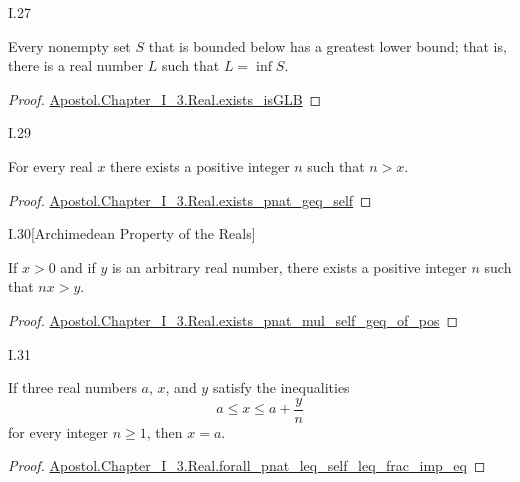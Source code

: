 \documentclass{article}
\begin{document}
\begin{xtheorem}{I.27}

  Every nonempty set $S$ that is bounded below has a greatest lower bound; that
  is, there is a real number $L$ such that $L = \inf{S}$.

\end{xtheorem}

\begin{proof}

  \href{Chapter_I_3.lean}{Apostol.Chapter_I_3.Real.exists_isGLB}

\end{proof}

\begin{xtheorem}{I.29}

  For every real $x$ there exists a positive integer $n$ such that $n > x$.

\end{xtheorem}

\begin{proof}

  \href{Chapter_I_3.lean}{Apostol.Chapter_I_3.Real.exists_pnat_geq_self}

\end{proof}

\begin{xtheorem}{I.30}[Archimedean Property of the Reals]

  If $x > 0$ and if $y$ is an arbitrary real number, there exists a positive
  integer $n$ such that $nx > y$.

\end{xtheorem}

\begin{proof}

  \href{Chapter_I_3.lean}{Apostol.Chapter_I_3.Real.exists_pnat_mul_self_geq_of_pos}

\end{proof}

\begin{xtheorem}{I.31}

  If three real numbers $a$, $x$, and $y$ satisfy the inequalities
  $$a \leq x \leq a + \frac{y}{n}$$
  for every integer $n \geq 1$, then $x = a$.

\end{xtheorem}

\begin{proof}

  \href{Chapter_I_3.lean}{Apostol.Chapter_I_3.Real.forall_pnat_leq_self_leq_frac_imp_eq}

\end{proof}
\end{document}
